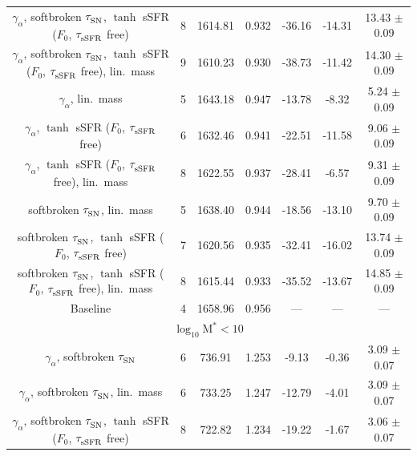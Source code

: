 \begin{longtable}{c c c c c c c}
    $\gamma_\alpha^{}$, softbroken $\tau_{\rm SN}^{}$, $\tanh$ sSFR ($F_0$, $\tau_{\rm sSFR}^{}$ free) & 8 & 1614.81 & 0.932 & \cellcolor{aicgreen}-36.16 & \cellcolor{aicgreen}-14.31 & \cellcolor{aicgreen}13.43 $\pm$ 0.09 \\
    $\gamma_\alpha^{}$, softbroken $\tau_{\rm SN}^{}$, $\tanh$ sSFR ($F_0$, $\tau_{\rm sSFR}^{}$ free), lin.\ mass & 9 & 1610.23 & 0.930 & \cellcolor{aicgreen}-38.73 & \cellcolor{aicgreen}-11.42 & \cellcolor{aicgreen}14.30 $\pm$ 0.09 \\
    $\gamma_\alpha^{}$, lin.\ mass & 5 & 1643.18 & 0.947 & \cellcolor{aicgreen}-13.78 & \cellcolor{aiclightgreen}-8.32 & \cellcolor{aicgreen}5.24 $\pm$ 0.09 \\
    $\gamma_\alpha^{}$, $\tanh$ sSFR ($F_0$, $\tau_{\rm sSFR}^{}$ free) & 6 & 1632.46 & 0.941 & \cellcolor{aicgreen}-22.51 & \cellcolor{aicgreen}-11.58 & \cellcolor{aicgreen}9.06 $\pm$ 0.09 \\
    $\gamma_\alpha^{}$, $\tanh$ sSFR ($F_0$, $\tau_{\rm sSFR}^{}$ free), lin.\ mass & 8 & 1622.55 & 0.937 & \cellcolor{aicgreen}-28.41 & \cellcolor{aiclightgreen}-6.57 & \cellcolor{aicgreen}9.31 $\pm$ 0.09 \\
    softbroken $\tau_{\rm SN}^{}$, lin.\ mass & 5 & 1638.40 & 0.944 & \cellcolor{aicgreen}-18.56 & \cellcolor{aicgreen}-13.10 & \cellcolor{aicgreen}9.70 $\pm$ 0.09 \\
    softbroken $\tau_{\rm SN}^{}$, $\tanh$ sSFR ($F_0$, $\tau_{\rm sSFR}^{}$ free) & 7 & 1620.56 & 0.935 & \cellcolor{aicgreen}-32.41 & \cellcolor{aicgreen}-16.02 & \cellcolor{aicgreen}13.74 $\pm$ 0.09 \\
    softbroken $\tau_{\rm SN}^{}$, $\tanh$ sSFR ($F_0$, $\tau_{\rm sSFR}^{}$ free), lin.\ mass & 8 & 1615.44 & 0.933 & \cellcolor{aicgreen}-35.52 & \cellcolor{aicgreen}-13.67 & \cellcolor{aicgreen}14.85 $\pm$ 0.09 \\
    Baseline & 4 & 1658.96 & 0.956 & --- & --- & --- \\
    \hline
    \multicolumn{7}{c}{\textbf{$\log_{10}^{} \mathrm{M}^* < 10$}} \\
    \hline
    $\gamma_\alpha^{}$, softbroken $\tau_{\rm SN}^{}$ & 6 & 736.91 & 1.253 & \cellcolor{aiclightgreen}-9.13 & -0.36 & \cellcolor{aiclightgreen}3.09 $\pm$ 0.07 \\
    $\gamma_\alpha^{}$, softbroken $\tau_{\rm SN}^{}$, lin.\ mass & 6 & 733.25 & 1.247 & \cellcolor{aicgreen}-12.79 & \cellcolor{aicyellow}-4.01 & \cellcolor{aiclightgreen}3.09 $\pm$ 0.07 \\
    $\gamma_\alpha^{}$, softbroken $\tau_{\rm SN}^{}$, $\tanh$ sSFR ($F_0$, $\tau_{\rm sSFR}^{}$ free) & 8 & 722.82 & 1.234 & \cellcolor{aicgreen}-19.22 & -1.67 & \cellcolor{aiclightgreen}3.06 $\pm$ 0.07 \\

\end{longtable}
